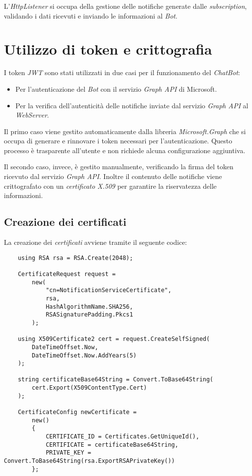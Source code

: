 L'\emph{HttpListener} si occupa della gestione delle notifiche generate dalle \emph{subscription}, validando i dati ricevuti e inviando le informazioni al \emph{Bot}.


\section{Utilizzo di token e crittografia}

I token \emph{JWT} sono stati utilizzati in due casi per il funzionamento del \emph{ChatBot}:
\begin{itemize}
	\item Per l'autenticazione del \emph{Bot} con il servizio \emph{Graph API} di Microsoft.
	\item Per la verifica dell'autenticità delle notifiche inviate dal servizio \emph{Graph API} al \emph{WebServer}.
\end{itemize}

Il primo caso viene gestito automaticamente dalla libreria \emph{Microsoft.Graph} che si occupa di generare e rinnovare i token necessari per l'autenticazione.
Questo processo è trasparente all'utente e non richiede alcuna configurazione aggiuntiva.

Il secondo caso, invece, è gestito manualmente, verificando la firma del token ricevuto dal servizio \emph{Graph API}.
Inoltre il contenuto delle notifiche viene crittografato con un \emph{certificato \gls{X.509}} per garantire la riservatezza delle informazioni.

\subsection{Creazione dei certificati}

\noindent La creazione dei \emph{certificati} avviene tramite il seguente codice:


\begin{lstlisting}
	using RSA rsa = RSA.Create(2048);

	CertificateRequest request =
		new(
			"cn=NotificationServiceCertificate",
			rsa,
			HashAlgorithmName.SHA256,
			RSASignaturePadding.Pkcs1
		);

	using X509Certificate2 cert = request.CreateSelfSigned(
		DateTimeOffset.Now,
		DateTimeOffset.Now.AddYears(5)
	);

	string certificateBase64String = Convert.ToBase64String(
		cert.Export(X509ContentType.Cert)
	);

	CertificateConfig newCertificate =
		new()
		{
			CERTIFICATE_ID = Certificates.GetUniqueId(),
			CERTIFICATE = certificateBase64String,
			PRIVATE_KEY = Convert.ToBase64String(rsa.ExportRSAPrivateKey())
		};
\end{lstlisting}

